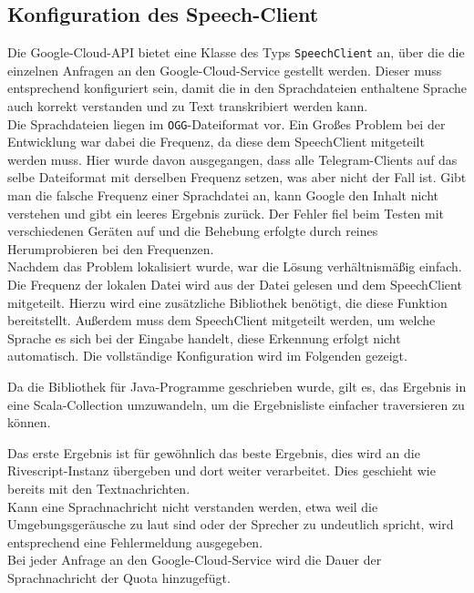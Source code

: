 \subsection{Konfiguration des Speech-Client}
Die Google-Cloud-API bietet eine Klasse des Typs \texttt{SpeechClient} an, über die die einzelnen Anfragen an den Google-Cloud-Service gestellt werden. Dieser muss entsprechend konfiguriert sein, damit die in den Sprachdateien enthaltene Sprache auch korrekt verstanden und zu Text transkribiert werden kann. \\
Die Sprachdateien liegen im \texttt{OGG}-Dateiformat vor. Ein Großes Problem bei der Entwicklung war dabei die Frequenz, da diese dem SpeechClient mitgeteilt werden muss. Hier wurde davon ausgegangen, dass alle Telegram-Clients auf das selbe Dateiformat mit derselben Frequenz setzen, was aber nicht der Fall ist. Gibt man die falsche Frequenz einer Sprachdatei an, kann Google den Inhalt nicht verstehen und gibt ein leeres Ergebnis zurück. Der Fehler fiel beim Testen mit verschiedenen Geräten auf und die Behebung erfolgte durch reines Herumprobieren bei den Frequenzen. \\
Nachdem das Problem lokalisiert wurde, war die Lösung verhältnismäßig einfach. Die Frequenz der lokalen Datei wird aus der Datei gelesen und dem SpeechClient mitgeteilt. Hierzu wird eine zusätzliche Bibliothek benötigt, die diese Funktion bereitstellt. Außerdem muss dem SpeechClient mitgeteilt werden, um welche Sprache es sich bei der Eingabe handelt, diese Erkennung erfolgt nicht automatisch. Die vollständige Konfiguration wird im Folgenden gezeigt.


Da die Bibliothek für Java-Programme geschrieben wurde, gilt es, das Ergebnis in eine Scala-Collection umzuwandeln, um die Ergebnisliste einfacher traversieren zu können.

Das erste Ergebnis ist für gewöhnlich das beste Ergebnis, dies wird an die Rivescript-Instanz übergeben und dort weiter verarbeitet. Dies geschieht wie bereits mit den Textnachrichten. \\
Kann eine Sprachnachricht nicht verstanden werden, etwa weil die Umgebungsgeräusche zu laut sind oder der Sprecher zu undeutlich spricht, wird entsprechend eine Fehlermeldung ausgegeben. \\
Bei jeder Anfrage an den Google-Cloud-Service wird die Dauer der Sprachnachricht der Quota hinzugefügt.
